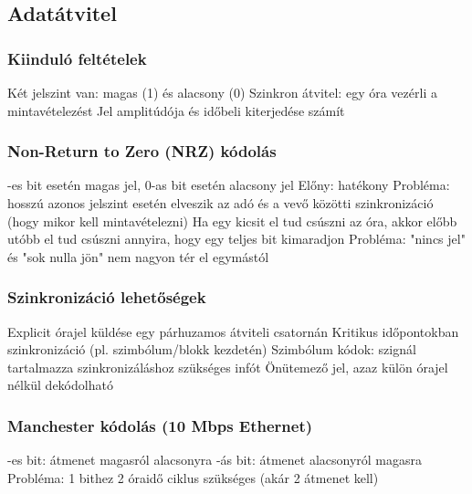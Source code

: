 \documentclass[12pt,a4paper]{article}
\begin{document}
\subsection{Adatátvitel}

\subsubsection{Kiinduló feltételek}

\begin{outline}
	\1 Két jelszint van: magas (1) és alacsony (0)
	\1 Szinkron átvitel: egy óra vezérli a mintavételezést
	\1 Jel amplitúdója és időbeli kiterjedése számít
\end{outline}

\subsubsection{Non-Return to Zero (NRZ) kódolás}

\begin{outline}
	-es bit esetén magas jel, 0-as bit esetén alacsony jel
	\1 Előny: hatékony
	\1 Probléma: hosszú azonos jelszint esetén elveszik az adó és a vevő közötti szinkronizáció
	(hogy mikor kell mintavételezni)
		\2 Ha egy kicsit el tud csúszni az óra, akkor előbb utóbb el tud csúszni annyira, hogy egy teljes bit kimaradjon
	\1 Probléma: "nincs jel" és "sok nulla jön" nem nagyon tér el egymástól
\end{outline}

\subsubsection{Szinkronizáció lehetőségek}

\begin{outline}
	\1 Explicit órajel küldése egy párhuzamos átviteli csatornán
	\1 Kritikus időpontokban szinkronizáció (pl. szimbólum/blokk kezdetén)
	\1 Szimbólum kódok: szignál tartalmazza szinkronizáláshoz szükséges infót
		\2 Önütemező jel, azaz külön órajel nélkül dekódolható
\end{outline}

\subsubsection{Manchester kódolás (10 Mbps Ethernet)}

\begin{outline}
	-es bit: átmenet magasról alacsonyra
	-ás bit: átmenet alacsonyról magasra
	\1 Probléma: 1 bithez 2 óraidő ciklus szükséges (akár 2 átmenet kell)
\end{outline}
\end{document}
